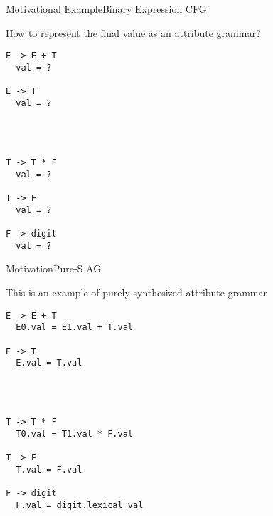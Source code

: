 
\begin{frame}[fragile=singleslide]{Motivational Example}{Binary Expression CFG}

How to represent the \alert{final value} as an attribute grammar?

\begin{multicols}{2}
\begin{Verbatim}[fontsize=\small]
E -> E + T
  val = ?

E -> T
  val = ?




T -> T * F
  val = ?

T -> F
  val = ?

F -> digit
  val = ?
\end{Verbatim}
\end{multicols}
\end{frame}



\begin{frame}[fragile=singleslide]{Motivation}{Pure-S AG}

This is an example of \alert{purely synthesized} attribute grammar

\begin{multicols}{2}
\begin{Verbatim}[fontsize=\small]
E -> E + T
  E0.val = E1.val + T.val

E -> T
  E.val = T.val




T -> T * F
  T0.val = T1.val * F.val

T -> F
  T.val = F.val

F -> digit
  F.val = digit.lexical_val
\end{Verbatim}
\end{multicols}

\end{frame}

